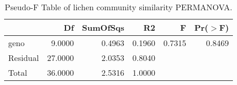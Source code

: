\begin{table}[ht]
\centering
\begin{tabular}{lrrrrr}
  \hline
 & Df & SumOfSqs & R2 & F & Pr($>$F) \\ 
  \hline
geno & 9.0000 & 0.4963 & 0.1960 & 0.7315 & 0.8469 \\ 
  Residual & 27.0000 & 2.0353 & 0.8040 &  &  \\ 
  Total & 36.0000 & 2.5316 & 1.0000 &  &  \\ 
   \hline
\end{tabular}
\caption{Pseudo-F Table of lichen community similarity PERMANOVA.} 
\label{tab:com_perm}
\end{table}
